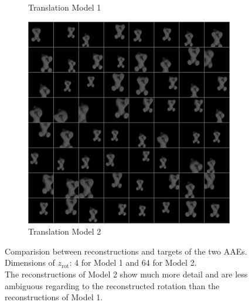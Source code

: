 \documentclass[10pt,a4paper]{article}
\newcommand{\rot}{\ensuremath{\text{rot}\xspace}}
\begin{document}
\begin{figure}[!ht]
\begin{subfigure}{0.3\textwidth}
        \caption{Translation Model 1}
        \label{cat_trec}
    \end{subfigure}
    \begin{subfigure}{0.3\textwidth}
        \centering	
        \includegraphics[width=\textwidth]{cat_64_output1.png}
        \caption{Translation Model 2}
        \label{cat_trec1}
    \end{subfigure}
    \caption{Comparision between reconstructions and targets of the two AAEs. 
        Dimensions of $z_{\rot}$: 4 for Model 1 and 64 for Model 2.\\
    The reconstructions of Model 2 show much more detail and are less ambiguous regarding to the reconstructed rotation than the reconstructions of Model 1.} \label{cat_images}
\end{figure}

\newpage
\end{document}
